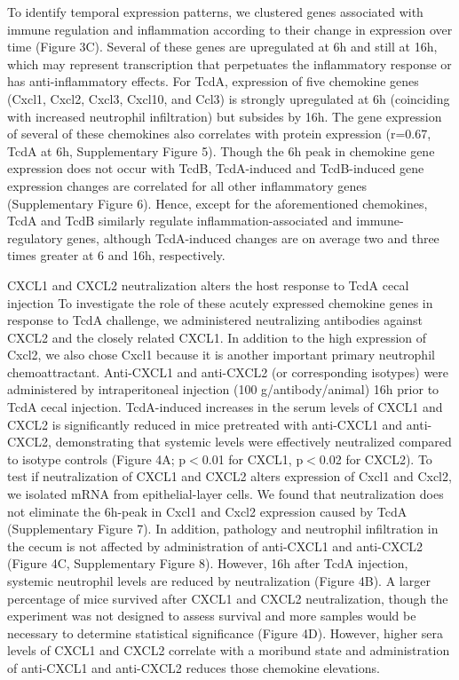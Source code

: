 To identify temporal expression patterns, we clustered genes associated with immune regulation and inflammation according to their change in expression over time (Figure 3C). Several of these genes are upregulated at 6h and still at 16h, which may represent transcription that perpetuates the inflammatory response or has anti-inflammatory effects. For TcdA, expression of five chemokine genes (Cxcl1, Cxcl2, Cxcl3, Cxcl10, and Ccl3) is strongly upregulated at 6h (coinciding with increased neutrophil infiltration) but subsides by 16h. The gene expression of several of these chemokines also correlates with protein expression (r=0.67, TcdA at 6h, Supplementary Figure 5). Though the 6h peak in chemokine gene expression does not occur with TcdB, TcdA-induced and TcdB-induced gene expression changes are correlated for all other inflammatory genes (Supplementary Figure 6). Hence, except for the aforementioned chemokines, TcdA and TcdB similarly regulate inflammation-associated and immune-regulatory genes, although TcdA-induced changes are on average two and three times greater at 6 and 16h, respectively.

CXCL1 and CXCL2 neutralization alters the host response to TcdA cecal injection
To investigate the role of these acutely expressed chemokine genes in response to TcdA challenge, we administered neutralizing antibodies against CXCL2 and the closely related CXCL1. In addition to the high expression of Cxcl2, we also chose Cxcl1 because it is another important primary neutrophil chemoattractant. Anti-CXCL1 and anti-CXCL2 (or corresponding isotypes) were administered by intraperitoneal injection (100 \textmu{}g/antibody/animal) 16h prior to TcdA cecal injection. TcdA-induced increases in the serum levels of CXCL1 and CXCL2 is significantly reduced in mice pretreated with anti-CXCL1 and anti-CXCL2, demonstrating that systemic levels were effectively neutralized compared to isotype controls (Figure 4A; p$<$0.01 for CXCL1, p$<$0.02 for CXCL2). To test if neutralization of CXCL1 and CXCL2 alters expression of Cxcl1 and Cxcl2, we isolated mRNA from epithelial-layer cells. We found that neutralization does not eliminate the 6h-peak in Cxcl1 and Cxcl2 expression caused by TcdA (Supplementary Figure 7). In addition, pathology and neutrophil infiltration in the cecum is not affected by administration of anti-CXCL1 and anti-CXCL2 (Figure 4C, Supplementary Figure 8). However, 16h after TcdA injection, systemic neutrophil levels are reduced by neutralization (Figure 4B). A larger percentage of mice survived after CXCL1 and CXCL2 neutralization, though the experiment was not designed to assess survival and more samples would be necessary to determine statistical significance (Figure 4D). However, higher sera levels of CXCL1 and CXCL2 correlate with a moribund state and administration of anti-CXCL1 and anti-CXCL2 reduces those chemokine elevations.

